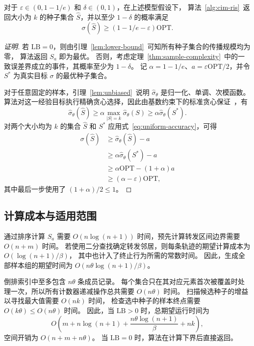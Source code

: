 \begin{theorem}[近似保证]
\label{thm:approx}
对于 $\varepsilon\in(0,1-1/e)$ 和 $\delta\in(0,1)$，在上述模型假设下，
算法~\ref{alg:cim-ris}~返回大小为 $k$ 的种子集合 $\hat S$，并以至少 $1-\delta$ 的概率满足
\begin{equation}
\label{eq:approx-bound}
 \sigma(\hat S)\ge(1-1/e-\varepsilon)\mathrm{OPT}.
\end{equation}
\end{theorem}
\begin{proof}[证明]\renewcommand{\qedsymbol}{}
若 $\mathrm{LB}=0$，则由引理~\ref{lem:lower-bound}~可知所有种子集合的传播规模均为零，
算法返回 $S_a$ 即为最优。
否则，考虑定理~\ref{thm:sample-complexity}~中的一致误差界成立的事件，其概率至少为 $1-\delta$。
记 $\alpha=1-1/e$、$a=\varepsilon\mathrm{OPT}/2$，并令 $S^*$ 为真实目标 $\sigma$ 的最优种子集合。

对于任意固定的样本，引理~\ref{lem:unbiased}~说明 $\hat\sigma_\theta$ 是归一化、单调、次模函数。
算法对这一经验目标执行精确贪心选择，因此由基数约束下的标准贪心保证~\cite{nemhauser1978analysis}，有
\[
 \hat\sigma_\theta(\hat S)
 \ge\alpha\max_{|S|=k}\hat\sigma_\theta(S)
 \ge\alpha\hat\sigma_\theta(S^*).
\]
对两个大小均为 $k$ 的集合 $\hat S$ 和 $S^*$ 应用式~\eqref{eq:uniform-accuracy}，可得
\begin{align*}
 \sigma(\hat S)
 &\ge\hat\sigma_\theta(\hat S)-a\\
 &\ge\alpha\hat\sigma_\theta(S^*)-a\\
 &\ge\alpha\mathrm{OPT}-(1+\alpha)a\\
 &\ge(\alpha-\varepsilon)\mathrm{OPT},
\end{align*}
其中最后一步使用了 $(1+\alpha)/2\le1$。
\end{proof}

\subsection{计算成本与适用范围}
\label{sec:discussion-sampling}

通过排序计算 $S_a$ 需要 $O(n\log(n+1))$ 时间，预先计算转发区间边界需要 $O(n+m)$ 时间。
若使用二分查找确定转发邻居，则每条轨迹的期望计算成本为 $O(\log(n+1)/\beta)$，
其中也计入了终止行为所需的常数时间。
因此，生成全部样本组的期望时间为 $O(n\theta\log(n+1)/\beta)$。

倒排索引中至多包含 $n\theta$ 条成员记录。
每个集合只在其对应元素首次被覆盖时处理一次，所以所有计数器递减操作总共需要 $O(n\theta)$ 时间。
扫描候选种子的增益以寻找最大值需要 $O(nk)$ 时间，
检查选中种子的样本终点需要 $O(k\theta)\le O(n\theta)$ 时间。
因此，当 $\mathrm{LB}>0$ 时，总期望运行时间为
\begin{equation}
\label{eq:total-complexity}
 O\left(m+n\log(n+1)+\frac{n\theta\log(n+1)}{\beta}+nk\right),
\end{equation}
空间开销为 $O(n+m+n\theta)$。
当 $\mathrm{LB}=0$ 时，算法在计算下界后直接返回。

